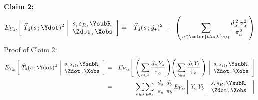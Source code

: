 \begin{enumerate}
    \vskip 0.5cm        
    \noindent
    \textbf{Claim 2:}\quad
    \begin{eqnarray*}
    E_{Y_{M}}\!\left[\;
        \widehat{T}_{d}(s\,;\Ydot)^{2}
        \,\left\vert
        \begin{array}{c}
            s,s_{R},\YsubR, \\ \Zdot\,,\Xobs
            \end{array}
        \right.
        \!\right]
    & = &
        \widehat{T}_{d}(s\,;\widetilde{y}_{\bullet})^{2}
        \; + \;
        \left(\,
            \underset{a \in {\color{black}s_{M}}}{\sum}
            \dfrac{d_{a}^{\,2}\,\sigma^{2}_{a}}{\pi_{a}^{2}}
            \,\right)
    \end{eqnarray*}
    \vskip 0.1cm
    \noindent
    Proof of Claim 2:\;\;
    \begin{eqnarray*}
    E_{Y_{M}}\!\left[\;
        \widehat{T}_{d}(s\,;\Ydot)^{2}
        \,\left\vert
        \begin{array}{c}
            s,s_{R},\YsubR, \\ \Zdot\,,\Xobs
            \end{array}
        \right.
        \!\right]
    & = &
        E_{Y_{M}}\!\left[\;
            \left(\,
                \underset{a \in s}{\sum}\,\dfrac{d_{a}\,Y_{a}}{\pi_{a}}
                \,\right)
            \!
            \left(\,
                \underset{b \in s}{\sum}\,\dfrac{d_{b}\,Y_{b}}{\pi_{b}}
                \,\right)
            \,\left\vert
            \begin{array}{c}
                s,s_{R},\YsubR, \\ \Zdot\,,\Xobs
                \end{array}
            \right.
            \!\right]
    \\
    & = &
        \underset{a \in s}{\sum}\,
        \underset{b \in s}{\sum}\;\,
        \dfrac{d_{a}}{\pi_{a}}\,
        \dfrac{d_{b}}{\pi_{b}}\,
        E_{Y_{M}}\!\left[\;
            Y_{a}\,Y_{b}
            \,\left\vert
            \begin{array}{c}
                s,s_{R},\YsubR, \\ \Zdot\,,\Xobs
                \end{array}
            \right.
            \;\right]

\end{eqnarray*}
\end{enumerate}
